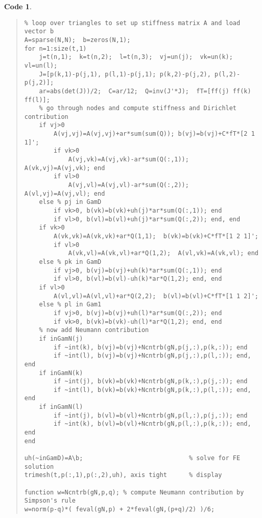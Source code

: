\documentclass[12pt]{amsart}
\theoremstyle{definition}
\newtheorem*{code}{Code}
\begin{document}
\begin{code}
\begin{quote}
\begin{verbatim}
% loop over triangles to set up stiffness matrix A and load vector b
A=sparse(N,N);  b=zeros(N,1);
for n=1:size(t,1)
    j=t(n,1);  k=t(n,2);  l=t(n,3);  vj=un(j);  vk=un(k);  vl=un(l);
    J=[p(k,1)-p(j,1), p(l,1)-p(j,1); p(k,2)-p(j,2), p(l,2)-p(j,2)];
    ar=abs(det(J))/2;  C=ar/12;  Q=inv(J'*J);  fT=[ff(j) ff(k) ff(l)];
    % go through nodes and compute stiffness and Dirichlet contribution
    if vj>0
        A(vj,vj)=A(vj,vj)+ar*sum(sum(Q)); b(vj)=b(vj)+C*fT*[2 1 1]';
        if vk>0
            A(vj,vk)=A(vj,vk)-ar*sum(Q(:,1));  A(vk,vj)=A(vj,vk); end
        if vl>0
            A(vj,vl)=A(vj,vl)-ar*sum(Q(:,2));  A(vl,vj)=A(vj,vl); end
    else % pj in GamD
        if vk>0, b(vk)=b(vk)+uh(j)*ar*sum(Q(:,1)); end
        if vl>0, b(vl)=b(vl)+uh(j)*ar*sum(Q(:,2)); end, end
    if vk>0
        A(vk,vk)=A(vk,vk)+ar*Q(1,1);  b(vk)=b(vk)+C*fT*[1 2 1]';
        if vl>0
            A(vk,vl)=A(vk,vl)+ar*Q(1,2);  A(vl,vk)=A(vk,vl); end
    else % pk in GamD
        if vj>0, b(vj)=b(vj)+uh(k)*ar*sum(Q(:,1)); end
        if vl>0, b(vl)=b(vl)-uh(k)*ar*Q(1,2); end, end
    if vl>0
        A(vl,vl)=A(vl,vl)+ar*Q(2,2);  b(vl)=b(vl)+C*fT*[1 1 2]';
    else % pl in Gam1
        if vj>0, b(vj)=b(vj)+uh(l)*ar*sum(Q(:,2)); end
        if vk>0, b(vk)=b(vk)-uh(l)*ar*Q(1,2); end, end
    % now add Neumann contribution
    if inGamN(j)
        if ~int(k), b(vj)=b(vj)+Ncntrb(gN,p(j,:),p(k,:)); end
        if ~int(l), b(vj)=b(vj)+Ncntrb(gN,p(j,:),p(l,:)); end,  end
    if inGamN(k)
        if ~int(j), b(vk)=b(vk)+Ncntrb(gN,p(k,:),p(j,:)); end
        if ~int(l), b(vk)=b(vk)+Ncntrb(gN,p(k,:),p(l,:)); end,  end
    if inGamN(l)
        if ~int(j), b(vl)=b(vl)+Ncntrb(gN,p(l,:),p(j,:)); end
        if ~int(k), b(vl)=b(vl)+Ncntrb(gN,p(l,:),p(k,:)); end,  end
end

uh(~inGamD)=A\b;                             % solve for FE solution
trimesh(t,p(:,1),p(:,2),uh), axis tight      % display

function w=Ncntrb(gN,p,q); % compute Neumann contribution by Simpson's rule
w=norm(p-q)*( feval(gN,p) + 2*feval(gN,(p+q)/2) )/6;
\end{verbatim}
\end{quote}\end{code}\normalsize
\medskip
\end{document}
